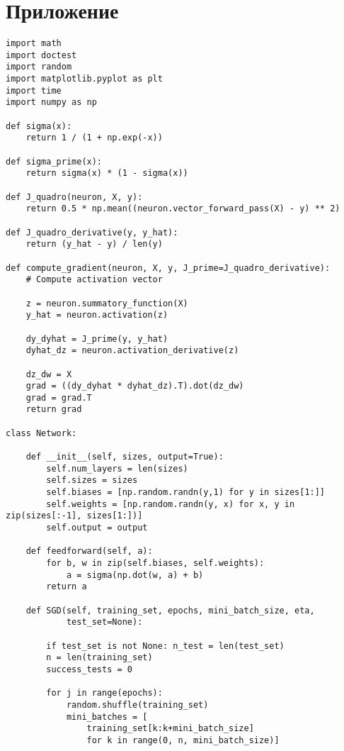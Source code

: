 \newpage

\chapter*{Приложение}


\begin{lstlisting}
import math
import doctest
import random
import matplotlib.pyplot as plt
import time
import numpy as np

def sigma(x):
    return 1 / (1 + np.exp(-x))

def sigma_prime(x):
    return sigma(x) * (1 - sigma(x))

def J_quadro(neuron, X, y):
    return 0.5 * np.mean((neuron.vector_forward_pass(X) - y) ** 2)

def J_quadro_derivative(y, y_hat):
    return (y_hat - y) / len(y)

def compute_gradient(neuron, X, y, J_prime=J_quadro_derivative):
    # Compute activation vector

    z = neuron.summatory_function(X)
    y_hat = neuron.activation(z)

    dy_dyhat = J_prime(y, y_hat)
    dyhat_dz = neuron.activation_derivative(z)

    dz_dw = X
    grad = ((dy_dyhat * dyhat_dz).T).dot(dz_dw)
    grad = grad.T
    return grad

class Network:

    def __init__(self, sizes, output=True):
        self.num_layers = len(sizes)
        self.sizes = sizes
        self.biases = [np.random.randn(y,1) for y in sizes[1:]]
        self.weights = [np.random.randn(y, x) for x, y in zip(sizes[:-1], sizes[1:])]
        self.output = output
        
    def feedforward(self, a):
        for b, w in zip(self.biases, self.weights):
            a = sigma(np.dot(w, a) + b)
        return a
    
    def SGD(self, training_set, epochs, mini_batch_size, eta,
            test_set=None):
        
        if test_set is not None: n_test = len(test_set)
        n = len(training_set)
        success_tests = 0

        for j in range(epochs):
            random.shuffle(training_set)
            mini_batches = [
                training_set[k:k+mini_batch_size]
                for k in range(0, n, mini_batch_size)]


\end{lstlisting}
